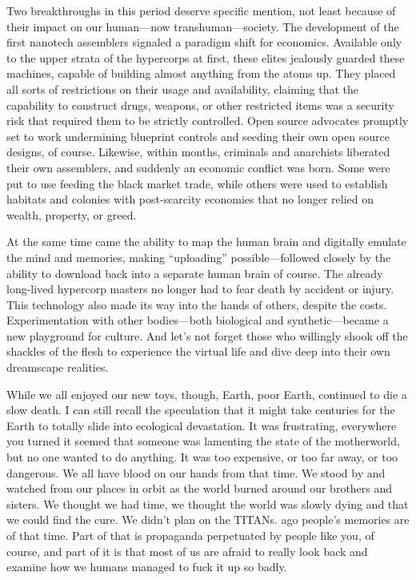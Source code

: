 Two breakthroughs in this period deserve specific mention, not least because of their impact on our 
human—now transhuman—society. The development 
of the first nanotech assemblers signaled a paradigm 
shift for economics. Available only to the upper 
strata of the hypercorps at first, these elites jealously 
guarded these machines, capable of building almost 
anything from the atoms up. They placed all sorts of 
restrictions on their usage and availability, claiming 
that the capability to construct drugs, weapons, or 
other restricted items was a security risk that required 
them to be strictly controlled. Open source advocates 
promptly set to work undermining blueprint controls 
and seeding their own open source designs, of course. 
Likewise, within months, criminals and anarchists 
liberated their own assemblers, and suddenly an economic conflict was born. Some were put to use feeding the black market trade, while others were used 
to establish habitats and colonies with post-scarcity 
economies that no longer relied on wealth, property, 
or greed.

At the same time came the ability to map the 
human brain and digitally emulate the mind and 
memories, making ``uploading'' possible—followed 
closely by the ability to download back into a separate human brain of course. The already long-lived 
hypercorp masters no longer had to fear death by 
accident or injury. This technology also made its way 
into the hands of others, despite the costs. Experimentation with other bodies—both biological and 
synthetic—became a new playground for culture. 
And let's not forget those who willingly shook off the 
shackles of the flesh to experience the virtual life and 
dive deep into their own dreamscape realities.

While we all enjoyed our new toys, though, Earth, 
poor Earth, continued to die a slow death. I can still 
recall the speculation that it might take centuries for 
the Earth to totally slide into ecological devastation. It 
was frustrating, everywhere you turned it seemed that 
someone was lamenting the state of the motherworld, 
but no one wanted to do anything. It was too expensive, or too far away, or too dangerous. We all have 
blood on our hands from that time. We stood by and 
watched from our places in orbit as the world burned 
around our brothers and sisters. We thought we had 
time, we thought the world was slowly dying and that 
we could find the cure. We didn't plan on the TITANs.
ago
people's memories are of that time. Part of that is 
propaganda perpetuated by people like you, of course, 
and part of it is that most of us are afraid to really 
look back and examine how we humans managed to 
fuck it up so badly.

